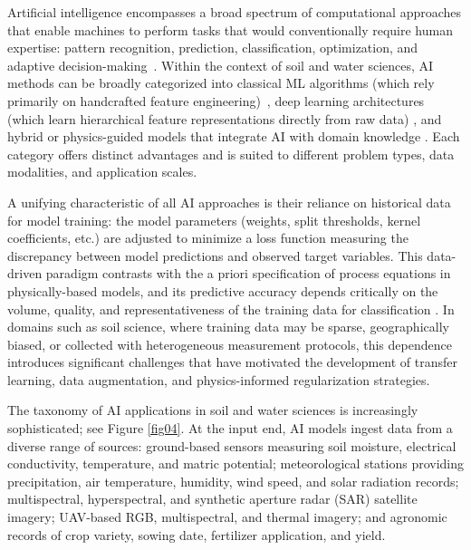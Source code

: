 \documentclass[land,review,accept,pdftex,oneauthor]{Definitions/mdpi}
\begin{document}
Artificial intelligence encompasses a broad spectrum of computational approaches that enable machines to perform tasks that would conventionally require human expertise: pattern recognition, prediction, classification, optimization, and adaptive decision-making~\cite{Fan2018}. Within the context of soil and water sciences, AI methods can be broadly categorized into classical ML algorithms (which rely primarily on handcrafted feature engineering)~\cite{Amani}, deep learning architectures (which learn hierarchical feature representations directly from raw data) \cite{Attri}, and hybrid or physics-guided models that integrate AI with domain knowledge \citep{jordan2015machine}. Each category offers distinct advantages and is suited to different problem types, data modalities, and application scales.

A unifying characteristic of all AI approaches is their reliance on historical data for model training: the model parameters (weights, split thresholds, kernel coefficients, etc.) are adjusted to minimize a loss function measuring the discrepancy between model predictions and observed target variables. This data-driven paradigm contrasts with the a priori specification of process equations in physically-based models, and its predictive accuracy depends critically on the volume, quality, and representativeness of the training data for classification \cite{Tso2007}. In domains such as soil science, where training data may be sparse, geographically biased, or collected with heterogeneous measurement protocols, this dependence introduces significant challenges that have motivated the development of transfer learning, data augmentation, and physics-informed regularization strategies.

The taxonomy of AI applications in soil and water sciences is increasingly sophisticated; see Figure \ref{fig04}. At the input end, AI models ingest data from a diverse range of sources: ground-based sensors measuring soil moisture, electrical conductivity, temperature, and matric potential; meteorological stations providing precipitation, air temperature, humidity, wind speed, and solar radiation records; multispectral, hyperspectral, and synthetic aperture radar (SAR) satellite imagery; UAV-based RGB, multispectral, and thermal imagery; and agronomic records of crop variety, sowing date, fertilizer application, and yield. 

\end{document}
